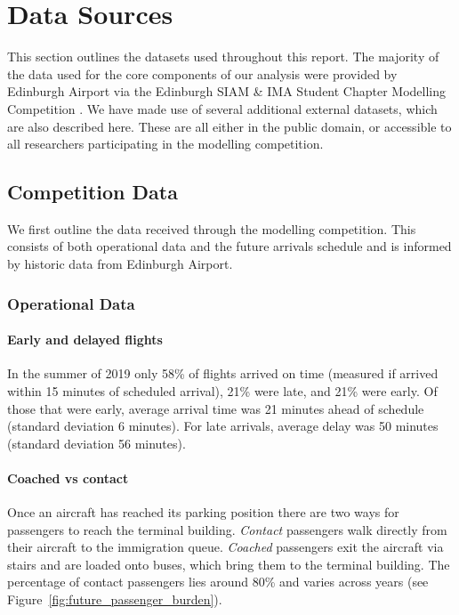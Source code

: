 \documentclass[10pt]{article}
\begin{document}
\section{Data Sources}
This section outlines the datasets used throughout this report. The majority of the data used for the core components of our analysis were provided by Edinburgh Airport via the Edinburgh SIAM \& IMA Student Chapter Modelling Competition \cite{modelling_competition}. We have made use of several additional external datasets, which are also described here. These are all either in the public domain, or accessible to all researchers participating in the modelling competition. 

\subsection{Competition Data}

We first outline the data received through the modelling competition. This consists of both operational data and the future arrivals schedule and is informed by historic data from Edinburgh Airport.


\subsubsection{Operational Data}

\paragraph{Early and delayed flights}
In the summer of 2019 only 58\% of flights arrived on time (measured if arrived within 15 minutes of scheduled arrival), 21\% were late, and 21\% were early. Of those that were early, average arrival time was 21 minutes ahead of schedule (standard deviation 6 minutes). For late arrivals, average delay was 50 minutes (standard deviation 56 minutes). 

\paragraph{Coached vs contact}
Once an aircraft has reached its parking position there are two ways for passengers to reach the terminal building. \textit{Contact} passengers walk directly from their aircraft to the immigration queue. \textit{Coached} passengers exit the aircraft via stairs and are loaded onto buses, which bring them to the terminal building. The percentage of contact passengers lies around 80\% and varies across years (see Figure~\ref{fig:future_passenger_burden}).
\end{document}

